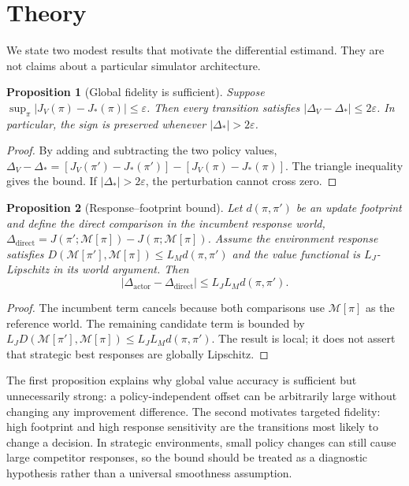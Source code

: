 \documentclass[10pt,twocolumn]{article}
\newcommand{\M}{\mathcal{M}}
\newcommand{\pii}{\pi}
\newcommand{\pip}{\pi'}
\newcommand{\dproxy}{\Delta_V}
\newcommand{\dtrue}{\Delta_*}
\newtheorem{proposition}{Proposition}
\begin{document}
\section{Theory}
We state two modest results that motivate the differential estimand. They are
not claims about a particular simulator architecture.

\begin{proposition}[Global fidelity is sufficient]
Suppose $\sup_\pi|J_V(\pi)-J_*(\pi)|\leq\varepsilon$. Then every transition
satisfies $|\dproxy-\dtrue|\leq2\varepsilon$. In particular, the sign is
preserved whenever $|\dtrue|>2\varepsilon$.
\end{proposition}
\begin{proof}
By adding and subtracting the two policy values,
$\dproxy-\dtrue=[J_V(\pip)-J_*(\pip)]-[J_V(\pii)-J_*(\pii)]$.
The triangle inequality gives the bound. If $|\dtrue|>2\varepsilon$, the
perturbation cannot cross zero.
\end{proof}

\begin{proposition}[Response--footprint bound]
Let $d(\pii,\pip)$ be an update footprint and define the direct comparison in
the incumbent response world, $\Delta_{\mathrm{direct}}=
J(\pip;\M[\pii])-J(\pii;\M[\pii])$. Assume the environment response
satisfies $D(\M[\pip],\M[\pii])\leq L_Md(\pii,\pip)$ and the value functional is
$L_J$-Lipschitz in its world argument. Then
\begin{equation}
 |\Delta_{\mathrm{actor}}-\Delta_{\mathrm{direct}}|
 \leq L_JL_Md(\pii,\pip).
\end{equation}
\end{proposition}
\begin{proof}
The incumbent term cancels because both comparisons use $\M[\pii]$ as the
reference world. The remaining candidate term is bounded by
$L_JD(\M[\pip],\M[\pii])\leq L_JL_Md(\pii,\pip)$. The result is local; it does
not assert that strategic best responses are globally Lipschitz.
\end{proof}

The first proposition explains why global value accuracy is sufficient but
unnecessarily strong: a policy-independent offset can be arbitrarily large
without changing any improvement difference. The second motivates targeted
fidelity: high footprint and high response sensitivity are the transitions most
likely to change a decision. In strategic environments, small policy changes
can still cause large competitor responses, so the bound should be treated as a
diagnostic hypothesis rather than a universal smoothness assumption.
\end{document}
